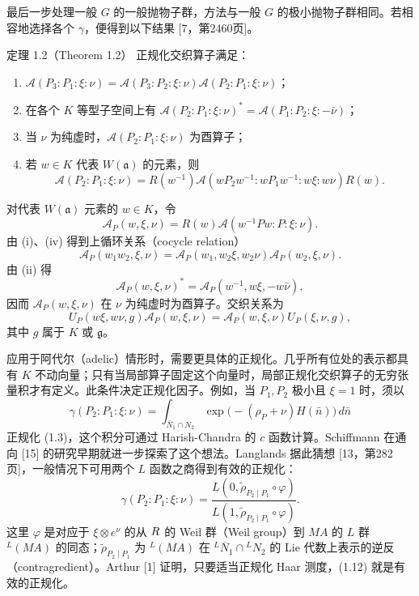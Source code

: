 最后一步处理一般 $G$ 的一般抛物子群，方法与一般 $G$ 的极小抛物子群相同。若相容地选择各个 $\gamma$，便得到以下结果 [7，第2460页]。
\begin{originaltheorem}{定理 1.2（Theorem 1.2）}
正规化交织算子满足：
\begin{enumerate}
\item[(i)] $\mathcal A(P_3:P_1:\xi:\nu)=\mathcal A(P_3:P_2:\xi:\nu)\mathcal A(P_2:P_1:\xi:\nu)$；
\item[(ii)] 在各个 $K$ 等型子空间上有 $\mathcal A(P_2:P_1:\xi:\nu)^*=\mathcal A(P_1:P_2:\xi:-\bar\nu)$；
\item[(iii)] 当 $\nu$ 为纯虚时，$\mathcal A(P_2:P_1:\xi:\nu)$ 为酉算子；
\item[(iv)] 若 $w\in K$ 代表 $W(\mathfrak a)$ 的元素，则
\[
 \mathcal A(P_2:P_1:\xi:\nu)=R(w^{-1})
 \mathcal A(wP_2w^{-1}:wP_1w^{-1}:w\xi:w\nu)R(w).
\]
\end{enumerate}
\end{originaltheorem}
对代表 $W(\mathfrak a)$ 元素的 $w\in K$，令
\[
 \mathcal A_P(w,\xi,\nu)=R(w)\mathcal A(w^{-1}Pw:P:\xi:\nu).
\]
由 (i)、(iv) 得到上循环关系（cocycle relation）
\begin{equation}
 \mathcal A_P(w_1w_2,\xi,\nu)=
 \mathcal A_P(w_1,w_2\xi,w_2\nu)\mathcal A_P(w_2,\xi,\nu).
 \tag{1.9}
\end{equation}
由 (ii) 得
\begin{equation}
 \mathcal A_P(w,\xi,\nu)^*=\mathcal A_P(w^{-1},w\xi,-w\bar\nu),
 \tag{1.10}
\end{equation}
因而 $\mathcal A_P(w,\xi,\nu)$ 在 $\nu$ 为纯虚时为酉算子。交织关系为
\begin{equation}
 U_P(w\xi,w\nu,g)\mathcal A_P(w,\xi,\nu)
 =\mathcal A_P(w,\xi,\nu)U_P(\xi,\nu,g),
 \tag{1.11}
\end{equation}
其中 $g$ 属于 $K$ 或 $\mathfrak g$。

应用于阿代尔（adelic）情形时，需要更具体的正规化。几乎所有位处的表示都具有 $K$ 不动向量；只有当局部算子固定这个向量时，局部正规化交织算子的无穷张量积才有定义。此条件决定正规化因子。例如，当 $P_1,P_2$ 极小且 $\xi=1$ 时，须以
\[
 \gamma(P_2:P_1:\xi:\nu)=\int_{\overline N_1\cap N_2}
 \exp\bigl(- (\rho_P+\nu)H(\bar n)\bigr)\,d\bar n
\]
正规化 (1.3)，这个积分可通过 Harish-Chandra 的 $c$ 函数计算。Schiffmann 在通向 [15] 的研究早期就进一步探索了这个想法。Langlands 据此猜想 [13，第282页]，一般情况下可用两个 $L$ 函数之商得到有效的正规化：
\begin{equation}
 \gamma(P_2:P_1:\xi:\nu)=
 \frac{L(0,\widetilde\rho_{P_2\mid P_1}\circ\varphi)}
 {L(1,\widetilde\rho_{P_2\mid P_1}\circ\varphi)}.
 \tag{1.12}
\end{equation}
这里 $\varphi$ 是对应于 $\xi\otimes e^\nu$ 的从 $R$ 的 Weil 群（Weil group）到 $MA$ 的 $L$ 群 ${}^L(MA)$ 的同态；$\widetilde\rho_{P_2\mid P_1}$ 为 ${}^L(MA)$ 在 ${}^L\overline N_1\cap{}^LN_2$ 的 Lie 代数上表示的逆反（contragredient）。Arthur [1] 证明，只要适当正规化 Haar 测度，(1.12) 就是有效的正规化。


